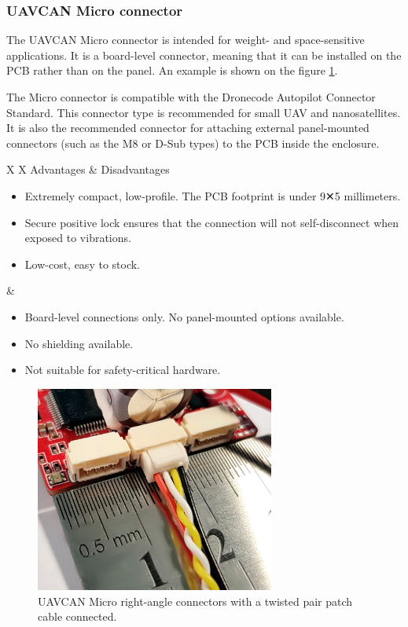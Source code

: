 \subsubsection{UAVCAN Micro connector}

The UAVCAN Micro connector is intended for weight- and space-sensitive applications.
It is a board-level connector, meaning that it can be installed on the PCB rather than on the panel.
An example is shown on the figure \ref{fig:can_uavcan_micro_connector_example}.

The Micro connector is compatible with the Dronecode Autopilot Connector Standard.
This connector type is recommended for small UAV and nanosatellites.
It is also the recommended connector for attaching external panel-mounted connectors
(such as the M8 or D-Sub types) to the PCB inside the enclosure.

{
\NoLeftSkip
\begin{UAVCANCompactTable}{X X}
    Advantages & Disadvantages \\
    \begin{itemize}
        \item Extremely compact, low-profile. The PCB footprint is under 9✕5 millimeters.
        \item Secure positive lock ensures that the connection will not self-disconnect when exposed to vibrations.
        \item Low-cost, easy to stock.
    \end{itemize}
    &
    \begin{itemize}
        \item Board-level connections only. No panel-mounted options available.
        \item No shielding available.
        \item Not suitable for safety-critical hardware.
    \end{itemize}
\end{UAVCANCompactTable}
}

\begin{figure}[hbt]
    \centering
    \includegraphics[width=0.7\textwidth]{transport_layer/jst_gh_connectors}
    \caption{UAVCAN Micro right-angle connectors with a twisted pair patch cable connected.
    \label{fig:can_uavcan_micro_connector_example}}
\end{figure}

